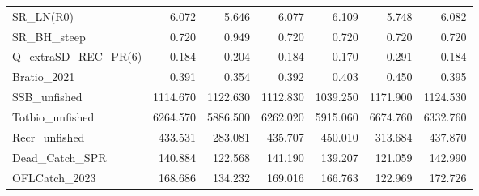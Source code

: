\documentclass[11pt,
  english,
]{article}
\begin{document}
\begin{landscape}
\begin{table}
{\begin{tabular}[t]{lrrrrrr}
SR\_LN(R0) & 6.072 & 5.646 & 6.077 & 6.109 & 5.748 & 6.082\\
SR\_BH\_steep & 0.720 & 0.949 & 0.720 & 0.720 & 0.720 & 0.720\\
Q\_extraSD\_REC\_PR(6) & 0.184 & 0.204 & 0.184 & 0.170 & 0.291 & 0.184\\
Bratio\_2021 & 0.391 & 0.354 & 0.392 & 0.403 & 0.450 & 0.395\\
SSB\_unfished & 1114.670 & 1122.630 & 1112.830 & 1039.250 & 1171.900 & 1124.530\\
Totbio\_unfished & 6264.570 & 5886.500 & 6262.020 & 5915.060 & 6674.760 & 6332.760\\
Recr\_unfished & 433.531 & 283.081 & 435.707 & 450.010 & 313.684 & 437.870\\
Dead\_Catch\_SPR & 140.884 & 122.568 & 141.190 & 139.207 & 121.059 & 142.990\\
OFLCatch\_2023 & 168.686 & 134.232 & 169.016 & 166.763 & 122.969 & 172.726\\
\bottomrule
\end{tabular}}
\end{table}
\end{landscape}
\end{document}
